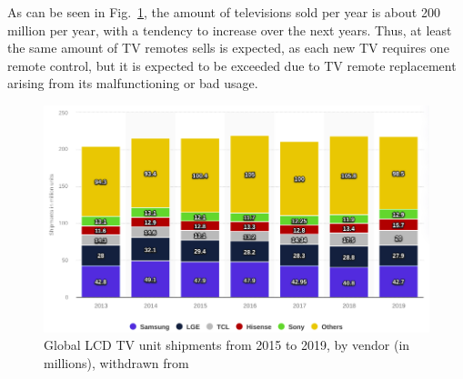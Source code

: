 As can be seen in Fig.~\ref{fig:tvsells}, the amount of televisions sold per
year is about 200 million per year, with a tendency to increase over the next
years. Thus, at least the same amount of TV remotes sells is expected, as each
new TV requires one remote control, but it is expected to be exceeded due to TV
remote replacement arising from its malfunctioning or bad usage.
%
\begin{figure}[htb!]
\centering
    \includegraphics[width=0.7\columnwidth]{./img/tvsellings.png}
  \caption{Global LCD TV unit shipments from 2015 to 2019, by vendor (in
    millions), withdrawn from~\cite{tvsellings}}%
\label{fig:tvsells}
\end{figure}
